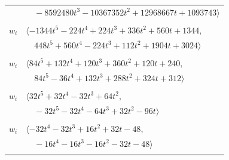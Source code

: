 \documentclass[11pt]{article}
\begin{document}
\begin{longtable}{@{}ll@{}}
 & $\quad -8592480t^{3}-10367352t^{2}+12968667t+1093743\rangle$\\
\addlinespace[2pt]
\multicolumn{2}{@{}p{0.97\textwidth}@{}}{$i=37$, $D_i=16$, $\rho_{ij}$: $1{:}2, \allowbreak 3{:}1, \allowbreak 5{:}1, \allowbreak 7{:}1, \allowbreak 13{:}1, \allowbreak 18{:}2, \allowbreak 19{:}2, \allowbreak 20{:}2, \allowbreak 23{:}1, \allowbreak 24{:}1, \allowbreak 26{:}2, \allowbreak 30{:}1, \allowbreak 31{:}1, \allowbreak 40{:}2, \allowbreak 46{:}1, \allowbreak 47{:}2, \allowbreak 49{:}2, \allowbreak 52{:}2, \allowbreak 60{:}1$}\\
$w_i$ & $\langle -1344t^{5}-224t^{4}+224t^{3}+336t^{2}+560t+1344,$\\
 & $\quad 448t^{5}+560t^{4}-224t^{3}+112t^{2}+1904t+3024\rangle$\\
\addlinespace[2pt]
\multicolumn{2}{@{}p{0.97\textwidth}@{}}{$i=38$, $D_i=4$, $\rho_{ij}$: $4{:}1, \allowbreak 5{:}1, \allowbreak 12{:}2, \allowbreak 15{:}1, \allowbreak 25{:}1, \allowbreak 34{:}2, \allowbreak 35{:}2, \allowbreak 46{:}1, \allowbreak 57{:}1, \allowbreak 58{:}1, \allowbreak 60{:}2, \allowbreak 64{:}1, \allowbreak 65{:}2, \allowbreak 68{:}1$}\\
$w_i$ & $\langle 84t^{5}+132t^{4}+120t^{3}+360t^{2}+120t+240,$\\
 & $\quad 84t^{5}-36t^{4}+132t^{3}+288t^{2}+324t+312\rangle$\\
\addlinespace[2pt]
\multicolumn{2}{@{}p{0.97\textwidth}@{}}{$i=39$, $D_i=32$, $\rho_{ij}$: $7{:}2, \allowbreak 15{:}1, \allowbreak 17{:}1, \allowbreak 20{:}1, \allowbreak 35{:}1, \allowbreak 43{:}1, \allowbreak 61{:}1, \allowbreak 63{:}1, \allowbreak 66{:}1$}\\
$w_i$ & $\langle 32t^{5}+32t^{4}-32t^{3}+64t^{2},$\\
 & $\quad -32t^{5}-32t^{4}-64t^{3}+32t^{2}-96t\rangle$\\
\addlinespace[2pt]
\multicolumn{2}{@{}p{0.97\textwidth}@{}}{$i=40$, $D_i=16$, $\rho_{ij}$: $5{:}1, \allowbreak 6{:}1, \allowbreak 9{:}1, \allowbreak 13{:}1, \allowbreak 19{:}1, \allowbreak 37{:}1, \allowbreak 46{:}1, \allowbreak 49{:}1, \allowbreak 55{:}1$}\\
$w_i$ & $\langle -32t^{4}-32t^{3}+16t^{2}+32t-48,$\\
 & $\quad -16t^{4}-16t^{3}-16t^{2}-32t-48\rangle$\\
\addlinespace[2pt]
\multicolumn{2}{@{}p{0.97\textwidth}@{}}{$i=41$, $D_i=33554432$, $\rho_{ij}$: $2{:}1, \allowbreak 3{:}1, \allowbreak 4{:}2, \allowbreak 14{:}1, \allowbreak 15{:}2, \allowbreak 16{:}2, \allowbreak 18{:}1, \allowbreak 19{:}2, \allowbreak 21{:}2, \allowbreak 23{:}2, \allowbreak 25{:}1, \allowbreak 29{:}1, \allowbreak 30{:}1, \allowbreak 31{:}2, \allowbreak 35{:}2, \allowbreak 42{:}1, \allowbreak 44{:}2, \allowbreak 50{:}2, \allowbreak 52{:}2, \allowbreak 54{:}1, \allowbreak 56{:}2, \allowbreak 66{:}2, \allowbreak 67{:}2, \allowbreak 69{:}2$}\\

\end{longtable}
\end{document}
